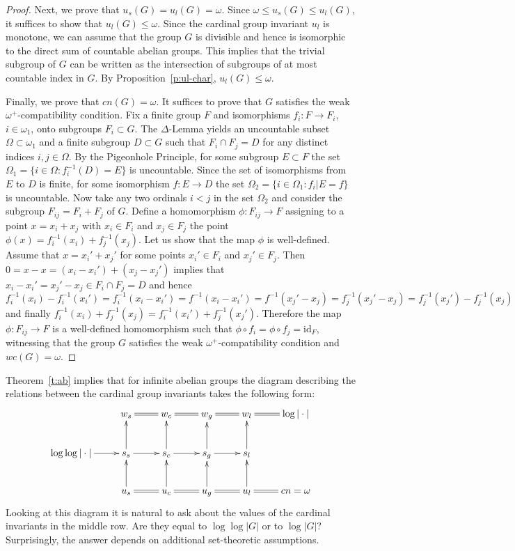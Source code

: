 \documentclass[11pt, twoside]{amsart}
\theoremstyle{definition}
\begin{document}
\begin{proof}
Next, we prove that $u_s(G)=u_l(G)={\omega}$. Since ${\omega}\le u_s(G)\le u_l(G)$, it suffices to show that $u_l(G)\le {\omega}$. Since the cardinal group invariant $u_l$ is monotone, we can assume that the group $G$ is divisible and hence is isomorphic to the direct sum of countable abelian groups. This implies that the trivial subgroup of $G$ can be written as the intersection of subgroups of at most countable index in $G$. By Proposition~\ref{p:ul-char}, $u_l(G)\le {\omega}$.
\smallskip

Finally, we prove that ${cn}(G)={\omega}$. It suffices to prove that $G$ satisfies the weak ${\omega}^+$-compatibility condition. Fix a finite group $F$ and isomorphisms $f_i:F\to F_i$, $i\in{\omega}_1$, onto subgroups $F_i\subset G$. The $\Delta$-Lemma \cite[9.18]{Jech} yields an uncountable subset $\Omega\subset{\omega}_1$ and a finite subgroup $D\subset G$ such that $F_i\cap F_j=D$ for any distinct indices $i,j\in\Omega$. By the Pigeonhole Principle, for some subgroup $E\subset F$ the set $\Omega_1=\{i\in\Omega: f^{-1}_i(D)=E\}$ is uncountable. Since the set of isomorphisms from $E$ to $D$ is finite, for some isomorphism $f:E\to D$ the set $\Omega_2=\{i\in\Omega_1:f_i|E=f\}$ is uncountable. Now take any two ordinals $i<j$ in the set $\Omega_2$ and consider the subgroup $F_{ij}=F_i+F_j$ of $G$. Define a homomorphism $\phi:F_{ij}\to F$ assigning to a point $x=x_i+x_j$ with $x_i\in F_i$ and $x_j\in F_j$ the point $\phi(x)=f_i^{-1}(x_i)+f_j^{-1}(x_j)$. Let us show that the map $\phi$ is well-defined. Assume that $x=x_i'+x_j'$ for some points $x_i'\in F_i$ and $x_j'\in F_j$. Then $0=x-x=(x_i-x_i')+(x_j-x_j')$ implies that $x_i-x_i'=x_j'-x_j\in F_i\cap F_j=D$ and hence
$$f_i^{-1}(x_i)-f_i^{-1}(x_i')=f_i^{-1}(x_i-x_i')=f^{-1}(x_i-x_i')=f^{-1}(x_j'-x_j)=f_j^{-1}(x_j'-x_j)=f_j^{-1}(x_j')-f_j^{-1}(x_j)$$and finally $f_i^{-1}(x_i)+f_j^{-1}(x_j)=f_i^{-1}(x_i')+f_j^{-1}(x_j')$. Therefore the map $\phi:F_{ij}\to F$ is a well-defined homomorphism such that $\phi\circ f_i=\phi\circ f_j={\mathrm{id}}_F$, witnessing that the group $G$ satisfies the weak ${\omega}^+$-compatibility condition and $wc(G)={\omega}$.
\end{proof}

Theorem~\ref{t:ab} implies that for infinite abelian groups the diagram describing the relations between the cardinal group invariants takes the following form:
$$
\xymatrix{
&w_s\ar@{=}[r]&w_c\ar@{=}[r]&w_g\ar@{=}[r]&w_l\ar@{=}[r]&\log|\cdot|\\
\log\log|\cdot|\ar[r]&s_s\ar[r]\ar[u]&s_c\ar[r]\ar[u]&s_g\ar[r]\ar[u]&s_l\ar[u]\\
&u_s\ar@{=}[r]\ar[u]&u_c\ar@{=}[r]\ar[u]&u_g\ar@{=}[r]\ar[u]&u_l\ar[u]&{cn}={\omega}\ar@{=}[l]
}
$$
Looking at this diagram it is natural to ask about the values of the cardinal invariants in the middle row. Are they equal to $\log\log|G|$ or to $\log|G|$? Surprisingly, the answer depends on additional set-theoretic assumptions.
\end{document}
